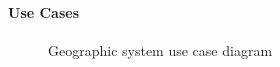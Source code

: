\documentclass{article}
\begin{document}
\paragraph{Use Cases}

\begin{figure}[H]
    \centering
    \begin{center}
    \end{center}
    \caption{Geographic system use case diagram}
    \label{fig:my_label}
\end{figure}
\pagebreak
\end{document}
